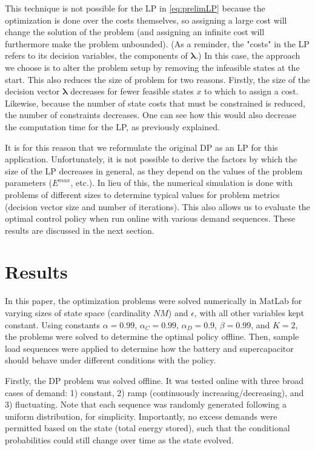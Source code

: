\documentclass[conference]{IEEEtran}
\begin{document}
This technique is not possible for the LP in \eqref{eq:prelimLP} because the optimization is done over the costs themselves, so assigning a large cost will change the solution of the problem (and assigning an infinite cost will furthermore make the problem unbounded). (As a reminder, the "costs" in the LP refers to its decision variables, the components of $\boldsymbol{\lambda}$.) In this case, the approach we choose is to alter the problem setup by removing the infeasible states at the start. This also reduces the size of problem for two reasons. Firstly, the size of the decision vector $\boldsymbol{\lambda}$ decreases for fewer feasible states $x$ to which to assign a cost. Likewise, because the number of state costs that must be constrained is reduced, the number of constraints decreases. One can see how this would also decrease the computation time for the LP, as previously explained.

It is for this reason that we reformulate the original DP as an LP for this application. Unfortunately, it is not possible to derive the factors by which the size of the LP decreases in general, as they depend on the values of the problem parameters ($E^{max}$, etc.). In lieu of this, the numerical simulation is done with problems of different sizes to determine typical values for problem metrics (decision vector size and number of iterations). This also allows us to evaluate the optimal control policy when run online with various demand sequences. These results are discussed in the next section.


\section{Results}
In this paper, the optimization problems were solved numerically in MatLab for varying sizes of state space (cardinality $NM$) and $\epsilon$, with all other variables kept constant. Using constants $\alpha=0.99$, $\alpha_{C}=0.99$, $\alpha_{D}=0.9$, $\beta=0.99$, and $K=2$, the problems were solved to determine the optimal policy offline. Then, sample load sequences were applied to determine how the battery and supercapacitor should behave under different conditions with the policy. %

Firstly, the DP problem was solved offline. It was tested online with three broad cases of demand: 1) constant, 2) ramp (continuously increasing/decreasing), and 3) fluctuating. Note that each sequence was randomly generated following a uniform distribution, for simplicity. Importantly, no excess demands were permitted based on the state (total energy stored), such that the conditional probabilities could still change over time as the state evolved.
\end{document}
